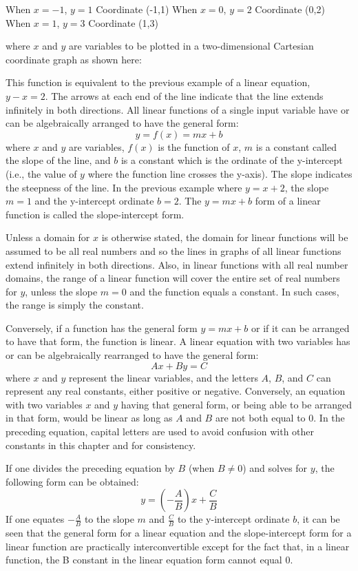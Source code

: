 When $x = -1$, $y = 1$  Coordinate (-1,1)
When $x = 0$, $y = 2$  Coordinate (0,2)
When $x = 1$, $y = 3$  Coordinate (1,3)

where $x$ and $y$ are variables to be plotted in a two-dimensional Cartesian coordinate graph as shown here:


This function is equivalent to the previous example of a linear equation, $y - x = 2$. The arrows at each end of the line indicate that the line extends infinitely in both directions. All linear functions of a single input variable have or can be algebraically arranged to have the general form:
$$
y = f(x) = mx + b
$$
where $x$ and $y$ are variables, $f(x)$ is the function of $x$, $m$ is a constant called the slope of the line, and $b$ is a constant which is the ordinate of the y-intercept (i.e., the value of $y$ where the function line crosses the y-axis). The slope indicates the steepness of the line. In the previous example where $y = x + 2$, the slope $m = 1$ and the y-intercept ordinate $b = 2$. The $y = mx + b$ form of a linear function is called the slope-intercept form.

Unless a domain for $x$ is otherwise stated, the domain for linear functions will be assumed to be all real numbers and so the lines in graphs of all linear functions extend infinitely in both directions. Also, in linear functions with all real number domains, the range of a linear function will cover the entire set of real numbers for $y$, unless the slope $m = 0$ and the function equals a constant. In such cases, the range is simply the constant.

Conversely, if a function has the general form $y = mx + b$ or if it can be arranged to have that form, the function is linear. A linear equation with two variables has or can be algebraically rearranged to have the general form:
$$
Ax + By = C
$$
where $x$ and $y$ represent the linear variables, and the letters $A$, $B$, and $C$ can represent any real constants, either positive or negative. Conversely, an equation with two variables $x$ and $y$ having that general form, or being able to be arranged in that form, would be linear as long as $A$ and $B$ are not both equal to 0. In the preceding equation, capital letters are used to avoid confusion with other constants in this chapter and for consistency.

If one divides the preceding equation by $B$ (when $B \neq 0$) and solves for $y$, the following form can be obtained:
$$
y = \left(-\frac{A}{B}\right)x + \frac{C}{B}
$$
If one equates $-\frac{A}{B}$ to the slope $m$ and $\frac{C}{B}$ to the y-intercept ordinate $b$, it can be seen that the general form for a linear equation and the slope-intercept form for a linear function are practically interconvertible except for the fact that, in a linear function, the B constant in the linear equation form cannot equal 0.

